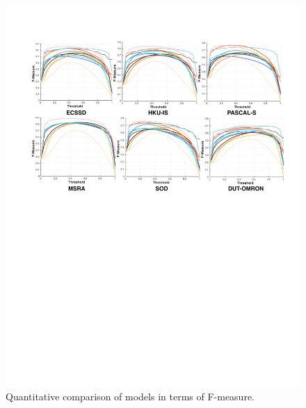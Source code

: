 \documentclass[journal]{IEEEtran}
\begin{document}
\begin{figure}[htbp]
\begin{center}
\includegraphics[width=1\linewidth]{f_merge.pdf}
\end{center}
\vspace{-10pt}
\caption{Quantitative comparison of models in terms of F-measure.}
\label{fig:8_2}
\end{figure}
\end{document}
